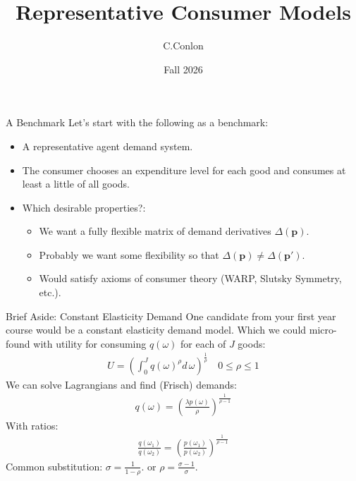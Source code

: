 \documentclass[aspectratio=169,11pt]{beamer}
\title{Representative Consumer Models}
\author{C.Conlon}
\institute{Grad IO }
\date{Fall 2026}
\begin{document}
\frame{\titlepage}

\begin{frame}{A Benchmark}
Let's start with the following as a benchmark:
\begin{itemize}
\item A \alert{representative agent} demand system.
\item The consumer chooses an \alert{expenditure} level for each good and consumes at least a little of all goods.
\item Which desirable properties?:
\begin{itemize}
\item We want a fully flexible matrix of demand derivatives $\Delta(\symbf{p})$.
\item Probably we want some flexibility so that $\Delta(\symbf{p}) \neq \Delta(\symbf{p'})$.
\item Would satisfy axioms of consumer theory (WARP, Slutsky Symmetry, etc.).
\end{itemize}
\end{itemize}
\end{frame}



\begin{frame}{Brief Aside: Constant Elasticity Demand}
One candidate from your first year course would be a \alert{constant elasticity demand model}. Which we could micro-found with utility for consuming $q(\omega)$ for each of $J$ goods:
\begin{eqnarray*}
U  = \left( \int_{0}^{J} q(\omega)^{\rho} d\, \omega \right)^{\frac{1}{\rho}} \quad 0 \leq \rho \leq 1
\end{eqnarray*}
We can solve Lagrangians and find (Frisch) demands:
\begin{eqnarray*}
q(\omega) = \left( \frac{\lambda p(\omega)}{\rho} \right)^{\frac{1}{\rho-1}}
\end{eqnarray*}
With ratios:
\begin{eqnarray*}
\frac{q(\omega_1)}{q(\omega_2)} = \left( \frac{p(\omega_1)}{p(\omega_2)} \right)^{\frac{1}{\rho-1}}
\end{eqnarray*}
Common substitution: $\sigma = \frac{1}{1-\rho}$. or $\rho = \frac{\sigma-1}{\sigma}$.
\end{frame}
\end{document}
